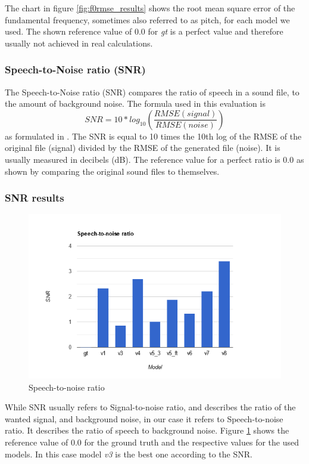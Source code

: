 \documentclass[a4paper]{article}
\begin{document}
The chart in figure \ref{fig:f0rmse_results} shows the root mean square error of
the fundamental frequency, sometimes also referred to as pitch, for each model
we used. The shown reference value of 0.0 for \emph{gt} is a perfect value and
therefore usually not achieved in real calculations.

\subsubsection*{Speech-to-Noise ratio (SNR)}
The Speech-to-Noise ratio (SNR) compares the ratio of speech in a sound file, to
the amount of background noise. The formula used in this evaluation is \\
\[
    SNR = 10*log_{10} (\frac{RMSE(signal)}{RMSE(noise)})
\]
as formulated in \cite{ji2020comprehensivesurveydeepmusic}. The SNR is equal to 10 times the 10th log of the RMSE of
the original file (signal) divided by the RMSE of the generated file (noise). It
is usually measured in decibels (dB). The reference value for a perfect ratio is
0.0 as shown by comparing the original sound files to themselves.

\subsubsection*{SNR results}
\begin{figure}[hbtp]
    \includegraphics[width=\textwidth]{evaluation/graphs/SNR.png}
    \caption{Speech-to-noise ratio}
    \label{fig:snr}
\end{figure}

While SNR usually refers to Signal-to-noise ratio, and describes the ratio of
the wanted signal, and background noise, in our case it refers to
Speech-to-noise ratio. It describes the ratio of speech to background noise.
Figure \ref{fig:snr} shows the reference value of 0.0 for the ground truth and
the respective values for the used models. In this case model \emph{v3} is the
best one according to the SNR.
\end{document}
